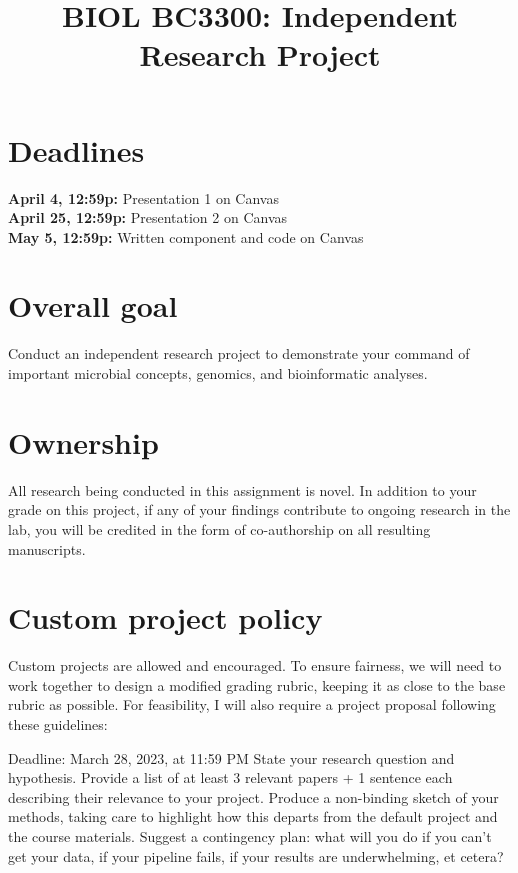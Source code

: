 \documentclass{article}
\title{BIOL BC3300: Independent Research Project}
\begin{document}
\maketitle{}

\section*{Deadlines}
\textbf{April 4, 12:59p: }Presentation 1 on Canvas\\
\textbf{April 25, 12:59p:} Presentation 2 on Canvas\\
\textbf{May 5, 12:59p:} Written component and code on Canvas

\section*{Overall goal} Conduct an independent research project to demonstrate your command of important microbial concepts, genomics, and bioinformatic analyses.

\section*{Ownership} All research being conducted in this assignment is novel. In addition to your grade on this project, if any of your findings contribute to ongoing research in the lab, you will be credited in the form of co-authorship on all resulting manuscripts.

\section*{Custom project policy} Custom projects are allowed and encouraged. To ensure fairness, we will need to work together to design a modified grading rubric, keeping it as close to the base rubric as possible. For feasibility, I will also require a project proposal following these guidelines:
\begin{outline}
    \1 Deadline: March 28, 2023, at 11:59 PM
    \1 State your research question and hypothesis.
    \1 Provide a list of at least 3 relevant papers + 1 sentence each describing their relevance to your project.
    \1 Produce a non-binding sketch of your methods, taking care to highlight how this departs from the default project and the course materials.
    \1 Suggest a contingency plan: what will you do if you can't get your data, if your pipeline fails, if your results are underwhelming, et cetera?
\end{outline}
\end{document}
